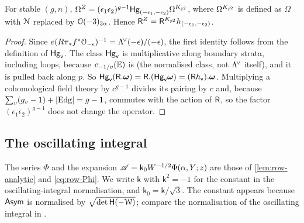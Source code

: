 \begin{lem}
\label{lem:gen-tensor}
For stable $(g,n)$, $\Omega^{Z}=(\epsilon_1\epsilon_2)^{g-1}\mathsf{Hg}_{(-\epsilon_1,-\epsilon_2)}\Omega^{K_{\mathbb{P}^2}}$, where $\Omega^{K_{\mathbb{P}^2}}$ is defined as $\Omega$ with $\mathcal{N}$ replaced by $\mathcal{O}(-3)_{3\alpha}$. Hence $\mathsf{R}^{Z}=\mathsf{R}^{K_{\mathbb{P}^2}}h_{(-\epsilon_1,-\epsilon_2)}$.
\end{lem}
\begin{proof}
Since $e(R\pi_*f^*\mathcal{O}_{-\epsilon})^{-1}=\Lambda^{\!\vee}(-\epsilon)/(-\epsilon)$, the first identity follows from the definition of $\mathsf{Hg}_{\mathsf{v}}$. The class $\mathsf{Hg}_{\mathsf{v}}$ is multiplicative along boundary strata, including loops, because $c_{-1/v}(\mathbb{E})$ is (the normalised class, not $\Lambda^{\!\vee}$ itself), and it is pulled back along $p$. So $\mathsf{Hg}_{\mathsf{v}}(\mathsf{R}.\boldsymbol{\omega})=\mathsf{R}.(\mathsf{Hg}_{\mathsf{v}}\boldsymbol{\omega})=(\mathsf{R} h_{\mathsf{v}}).\boldsymbol{\omega}$. Multiplying a cohomological field theory by $c^{g-1}$ divides its pairing by $c$ and, because $\sum_v(g_v-1)+|\mathrm{Edg}|=g-1$, commutes with the action of $\mathsf{R}$, so the factor $(\epsilon_1\epsilon_2)^{g-1}$ does not change the operator.
\end{proof}

\subsection{The oscillating integral}

The series $\Phi$ and the expansion $\mathscr{A}=\mathsf{k}_0W^{-1/2}\Phi(\alpha,Y;z)$ are those of \cref{lem:row-analytic} and \cref{eq:row-Phi}. We write $\mathsf{k}$ with $\mathsf{k}^2=-1$ for the constant in the oscillating-integral normalisation, and $\mathsf{k}_0=\mathsf{k}/\sqrt3$. The constant appears because $\mathsf{Asym}$ is normalised by $\sqrt{\det\mathsf{H}(-\mathcal{W})}$; compare the normalisation of the oscillating integral in \cite{BS}. 

